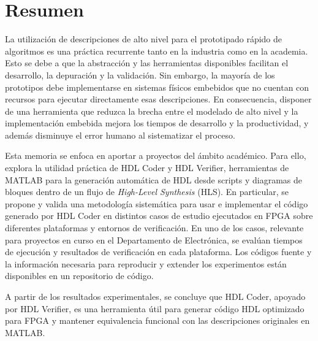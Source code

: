 \section*{Resumen}

La utilización de descripciones de alto nivel para el prototipado rápido de algoritmos es una práctica recurrente tanto en la industria como en la academia. Esto se debe a que la abstracción y las herramientas disponibles facilitan el desarrollo, la depuración y la validación. Sin embargo, la mayoría de los prototipos debe implementarse en sistemas físicos embebidos que no cuentan con recursos para ejecutar directamente esas descripciones. En consecuencia, disponer de una herramienta que reduzca la brecha entre el modelado de alto nivel y la implementación embebida mejora los tiempos de desarrollo y la productividad, y además disminuye el error humano al sistematizar el proceso.

Esta memoria se enfoca en aportar a proyectos del ámbito académico. Para ello, explora la utilidad práctica de HDL Coder y HDL Verifier, herramientas de MATLAB para la generación automática de HDL desde scripts y diagramas de bloques dentro de un flujo de \textit{High-Level Synthesis} (HLS). En particular, se propone y valida una metodología sistemática para usar e implementar el código generado por HDL Coder en distintos casos de estudio ejecutados en FPGA sobre diferentes plataformas y entornos de verificación. En uno de los casos, relevante para proyectos en curso en el Departamento de Electrónica, se evalúan tiempos de ejecución y resultados de verificación en cada plataforma. Los códigos fuente y la información necesaria para reproducir y extender los experimentos están disponibles en un repositorio de código.

A partir de los resultados experimentales, se concluye que HDL Coder, apoyado por HDL Verifier, es una herramienta útil para generar código HDL optimizado para FPGA y mantener equivalencia funcional con las descripciones originales en MATLAB.
